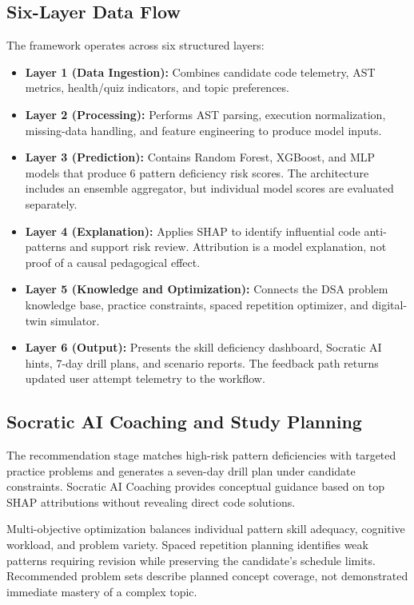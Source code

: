 \documentclass[conference]{IEEEtran}
\begin{document}
\subsection{Six-Layer Data Flow}
The framework operates across six structured layers:
\begin{itemize}
    \item \textbf{Layer 1 (Data Ingestion):} Combines candidate code telemetry, AST metrics, health/quiz indicators, and topic preferences.
    \item \textbf{Layer 2 (Processing):} Performs AST parsing, execution normalization, missing-data handling, and feature engineering to produce model inputs.
    \item \textbf{Layer 3 (Prediction):} Contains Random Forest, XGBoost, and MLP models that produce 6 pattern deficiency risk scores. The architecture includes an ensemble aggregator, but individual model scores are evaluated separately.
    \item \textbf{Layer 4 (Explanation):} Applies SHAP to identify influential code anti-patterns and support risk review. Attribution is a model explanation, not proof of a causal pedagogical effect.
    \item \textbf{Layer 5 (Knowledge and Optimization):} Connects the DSA problem knowledge base, practice constraints, spaced repetition optimizer, and digital-twin simulator.
    \item \textbf{Layer 6 (Output):} Presents the skill deficiency dashboard, Socratic AI hints, 7-day drill plans, and scenario reports. The feedback path returns updated user attempt telemetry to the workflow.
\end{itemize}

\subsection{Socratic AI Coaching and Study Planning}
The recommendation stage matches high-risk pattern deficiencies with targeted practice problems and generates a seven-day drill plan under candidate constraints. Socratic AI Coaching provides conceptual guidance based on top SHAP attributions without revealing direct code solutions.

Multi-objective optimization balances individual pattern skill adequacy, cognitive workload, and problem variety. Spaced repetition planning identifies weak patterns requiring revision while preserving the candidate's schedule limits. Recommended problem sets describe planned concept coverage, not demonstrated immediate mastery of a complex topic.
\end{document}
